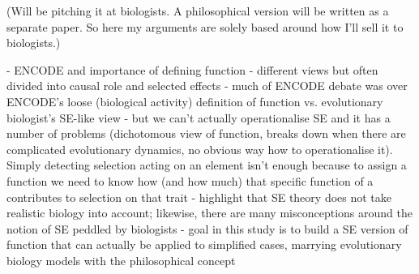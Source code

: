 \documentclass{article}
\begin{document}
(Will be pitching it at biologists. A philosophical version will be written as a separate paper. So here my arguments are solely based around how I'll sell it to biologists.)

- ENCODE and importance of defining function
- different views but often divided into causal role and selected effects
- much of ENCODE debate was over ENCODE's loose (biological activity) definition of function vs. evolutionary biologist's SE-like view
- but we can't actually operationalise SE and it has a number of problems (dichotomous view of function, breaks down when there are complicated evolutionary dynamics, no obvious way how to operationalise it). Simply detecting selection acting on an element isn't enough because to assign a function we need to know how (and how much) that specific function of a contributes to selection on that trait
- highlight that SE theory does not take realistic biology into account; likewise, there are many misconceptions around the notion of SE peddled by biologists
- goal in this study is to build a SE version of function that can actually be applied to simplified cases, marrying evolutionary biology models with the philosophical concept
\end{document}
